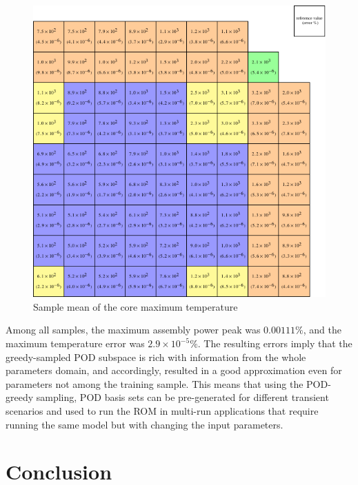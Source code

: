 \documentclass[review,number,sort&compress,12pt]{elsarticle}
\begin{document}
\begin{figure}[H]
	\centering
	\includegraphics[scale=1]{../figures/LRA_T_mean_err_peak.pdf}
	\caption{Sample mean of the core maximum temperature}
	\label{fig:T mean error}
\end{figure}
Among all samples, the maximum assembly power peak was $0.00111\%$, and the maximum temperature error was $2.9\times10^{-5}\%$.
The resulting errors imply that the greedy-sampled POD subspace is rich with information from the whole parameters domain,
and accordingly, resulted in a good approximation even for parameters not among the training sample.
This means that using the POD-greedy sampling, POD basis sets can be pre-generated for different transient scenarios and used to run the ROM in multi-run applications that require running the same model but with changing the input parameters.


\section{Conclusion}
\end{document}
